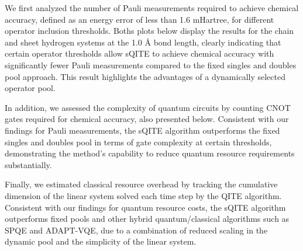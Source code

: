 \documentclass[aip,jcp,amsmath,amssymb, reprint]{revtex4-1}
\begin{document}

We first analyzed the number of Pauli measurements required to achieve chemical accuracy, defined as an energy error of less than 1.6 mHartree, for different operator inclusion thresholds. Boths plots below display the results for the chain and sheet hydrogen systems at the 1.0 Å bond length, clearly indicating that certain operator thresholds allow sQITE to achieve chemical accuracy with significantly fewer Pauli measurements compared to the fixed singles and doubles pool approach. This result highlights the advantages of a dynamically selected operator pool.

In addition, we assessed the complexity of quantum circuits by counting CNOT gates required for chemical accuracy, also presented below. Consistent with our findings for Pauli measurements, the sQITE algorithm outperforms the fixed singles and doubles pool in terms of gate complexity at certain thresholds, demonstrating the method's capability to reduce quantum resource requirements substantially.

Finally, we estimated classical resource overhead by tracking the cumulative dimension of the linear system solved each time step by the QITE algorithm. Consistent with our findings for quantum resource costs, the sQITE algorithm outperforms fixed pools and other hybrid quantum/classical algorithms such as SPQE and ADAPT-VQE, due to a combination of reduced scaling in the dynamic pool and the simplicity of the linear system.
\end{document}
